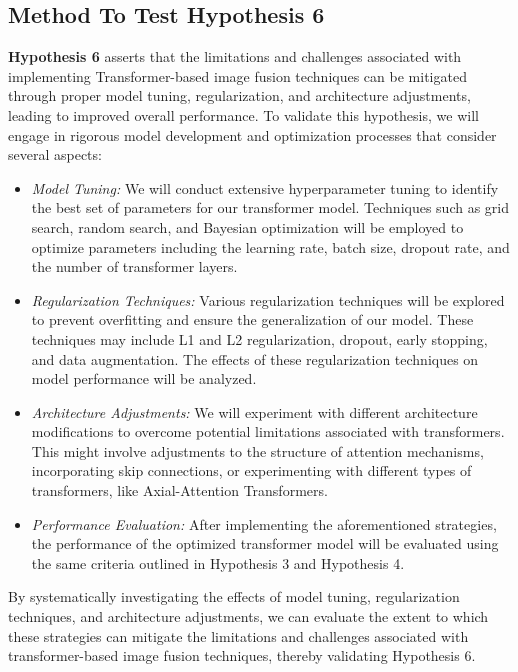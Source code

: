 \subsection{Method To Test Hypothesis 6} \label{subsec:met8}

\textbf{Hypothesis 6} asserts that the limitations and challenges associated with implementing Transformer-based image fusion techniques can be mitigated through proper model tuning, regularization, and architecture adjustments, leading to improved overall performance. To validate this hypothesis, we will engage in rigorous model development and optimization processes that consider several aspects:

\begin{itemize}
    \item \textit{Model Tuning:} We will conduct extensive hyperparameter tuning to identify the best set of parameters for our transformer model. Techniques such as grid search, random search, and Bayesian optimization will be employed to optimize parameters including the learning rate, batch size, dropout rate, and the number of transformer layers.

    \item \textit{Regularization Techniques:} Various regularization techniques will be explored to prevent overfitting and ensure the generalization of our model. These techniques may include L1 and L2 regularization, dropout, early stopping, and data augmentation. The effects of these regularization techniques on model performance will be analyzed.

    \item \textit{Architecture Adjustments:} We will experiment with different architecture modifications to overcome potential limitations associated with transformers. This might involve adjustments to the structure of attention mechanisms, incorporating skip connections, or experimenting with different types of transformers, like Axial-Attention Transformers.

    \item \textit{Performance Evaluation:} After implementing the aforementioned strategies, the performance of the optimized transformer model will be evaluated using the same criteria outlined in Hypothesis 3 and Hypothesis 4.
\end{itemize}


By systematically investigating the effects of model tuning, regularization techniques, and architecture adjustments, we can evaluate the extent to which these strategies can mitigate the limitations and challenges associated with transformer-based image fusion techniques, thereby validating Hypothesis 6.



